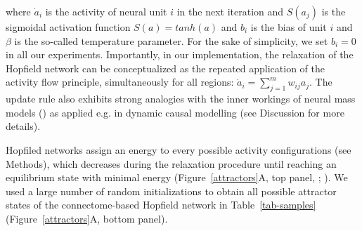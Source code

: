 \documentclass{article}
\begin{document}
where $\dot{a}_i$ is the activity of neural unit $i$ in the next iteration and $S(a_j)$ is the sigmoidal activation function $S(a) = tanh(a)$ and $b_i$ is the bias of unit $i$ and $\beta$ is the so-called temperature parameter. For the sake of simplicity, we set $b_i=0$ in all our experiments.
Importantly, in our implementation, the relaxation of the Hopfield network can be conceptualized as the repeated application of the activity flow principle, simultaneously for all regions: $\dot{a}_i = \sum_{j=1}^m w_{ij}a_j$. The update rule also exhibits strong analogies with the inner workings of neural mass models  (\href{https://doi.org/10.1038/nn.4497}{}) as applied e.g. in dynamic causal modelling (see Discussion for more details).

Hopfiled networks assign an energy to every possible activity configurations (see Methods), which decreases during the relaxation procedure until reaching an equilibrium state with minimal energy (Figure~\ref{attractors}A, top panel, \href{https://doi.org/10.1073/pnas.79.8.2554}{}; \href{https://doi.org/10.1162/neco.1994.6.3.459}{}).
We used a large number of random initializations to obtain all possible attractor states of the connectome-based Hopfield network in Table~\ref{tab-samples} (Figure~\ref{attractors}A, bottom panel).
\end{document}
